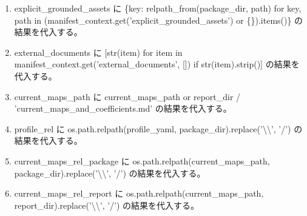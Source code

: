 \documentclass[a4paper,11pt]{article}
\begin{document}
\begin{enumerate}[leftmargin=1.8em]
\item explicit\_grounded\_assets に \{key: relpath\_from(package\_dir, path) for key, path in (manifest\_context.get('explicit\_grounded\_assets') or \{\}).items()\} の結果を代入する。
\item external\_documents に [str(item) for item in manifest\_context.get('external\_documents', []) if str(item).strip()] の結果を代入する。
\item current\_maps\_path に current\_maps\_path or report\_dir / 'current\_maps\_and\_coefficients.md' の結果を代入する。
\item profile\_rel に os.path.relpath(profile\_yaml, package\_dir).replace('\textbackslash{}\textbackslash{}', '/') の結果を代入する。
\item current\_maps\_rel\_package に os.path.relpath(current\_maps\_path, package\_dir).replace('\textbackslash{}\textbackslash{}', '/') の結果を代入する。
\item current\_maps\_rel\_report に os.path.relpath(current\_maps\_path, report\_dir).replace('\textbackslash{}\textbackslash{}', '/') の結果を代入する。

\end{enumerate}
\end{document}
